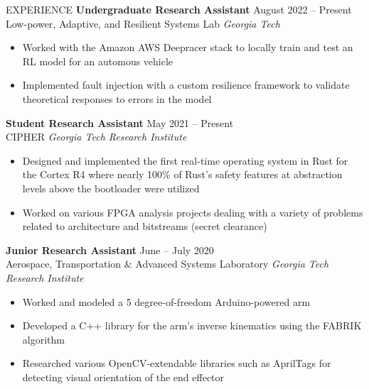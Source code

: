 \documentclass{resume} %
\begin{document}
\vspace{-0.8em}
\begin{rSection}{EXPERIENCE}
\textbf{Undergraduate Research Assistant} \hfill August 2022 -- Present\\
Low-power, Adaptive, and Resilient Systems Lab \hfill \textit{Georgia Tech}
\vspace{-0.5em}
   \begin{itemize}
      \itemsep -5pt {} 
      \item Worked with the Amazon AWS Deepracer stack to locally train and test an RL model
      for an automous vehicle
      \item Implemented fault injection with a custom resilience framework
      to validate theoretical responses to errors in the model
   \end{itemize}
\vspace{-0.5em}
\textbf{Student Research Assistant} \hfill May 2021 -- Present\\
CIPHER \hfill \textit{Georgia Tech Research Institute}
\vspace{-0.5em}
 \begin{itemize}
    \itemsep -5pt {} 
     \item Designed and implemented the first real-time operating system in Rust for the Cortex R4 where
     nearly 100\% of Rust's safety features at abstraction levels above the bootloader were utilized
     \item Worked on various FPGA analysis projects dealing with a variety of problems related to architecture and bitstreams (secret clearance)
 \end{itemize}
\vspace{-0.5em}
\textbf{Junior Research Assistant} \hfill June -- July 2020\\
Aerospace, Transportation \& Advanced Systems Laboratory \hfill \textit{Georgia Tech Research Institute}
\vspace{-0.5em}
 \begin{itemize}
    \itemsep -5pt {} 
     \item Worked and modeled a 5 degree-of-freedom Arduino-powered arm
     \item Developed a C++ library for the arm's inverse kinematics using the FABRIK algorithm
     \item Researched various OpenCV-extendable libraries such as AprilTags for detecting visual orientation of the end effector
 \end{itemize}
 \vspace{-0.5em}

\end{rSection}
\end{document}
